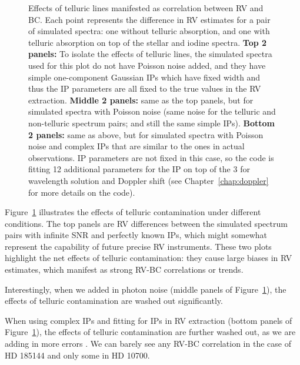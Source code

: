 \begin{figure}
\caption{Effects of telluric lines manifested as correlation between
  RV and BC. Each point represents the difference in RV estimates for
  a pair of simulated spectra: one without telluric absorption, and
  one with telluric absorption on top of the stellar and iodine
  spectra. {\bf Top 2 panels:} To isolate the effects of telluric
  lines, the simulated spectra used for this plot do not have Poisson
  noise added, and they have simple one-component Gaussian IPs which
  have fixed width and thus the IP parameters are all fixed to the
  true values in the RV extraction. {\bf Middle 2 panels:} same as the
  top panels, but for simulated spectra with Poisson noise (same noise
  for the telluric and non-telluric spectrum pairs; and still the same
  simple IPs). {\bf Bottom 2 panels:} same as above, but for simulated
  spectra with Poisson noise and complex IPs that are similar to the
  ones in actual observations. IP parameters are not fixed in this
  case, so the code is fitting 12 additional parameters for the IP on
  top of the 3 for wavelength solution and Doppler shift (see
  Chapter~\ref{chap:doppler} for more details on the code).
\label{telluric:fig:sim}}
\end{figure}

Figure~\ref{telluric:fig:sim} illustrates the effects of telluric
contamination under different conditions. The top panels are RV
differences between the simulated spectrum pairs with infinite SNR and
perfectly known IPs, which might somewhat represent the capability of
future precise RV instruments. These two plots highlight the net
effects of telluric contamination: they cause large biases in RV
estimates, which manifest as strong RV-BC correlations or
trends. 

Interestingly, when we added in photon noise (middle panels of
Figure~\ref{telluric:fig:sim}), the effects of telluric contamination
are washed out significantly. 

When using complex IPs and fitting for IPs in RV extraction (bottom
panels of Figure~\ref{telluric:fig:sim}), the effects of telluric
contamination are further washed out, as we are adding in more errors
. We can
barely see any RV-BC correlation in the case of HD 185144 and only
some in HD 10700.

